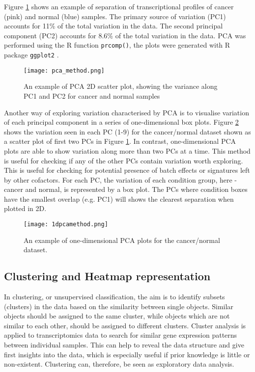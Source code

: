     Figure \ref{fig:pcamethod} shows an example of separation of transcriptional profiles of cancer (pink) and normal (blue) samples. The primary source of variation (PC1) accounts for 11\% of the total variation in the data. The second principal component (PC2) accounts for 8.6\% of the total variation in the data. PCA was performed using the R function \texttt{prcomp()}, the plots were generated with R package \texttt{ggplot2} \cite{ggplot2}.
    
            \begin{figure}[h]
            \centering
            \texttt{[image: pca\_method.png]}
            \caption{An example of PCA 2D scatter plot, showing the variance along PC1 and PC2 for cancer and normal samples}
            \label{fig:pcamethod}
            \end{figure}
        
    \newpage
    Another way of exploring variation characterised by PCA is to visualise variation of each principal component in a series of one-dimensional box plots. Figure \ref{fig:1dpcamethod} shows the variation seen in each PC (1-9) for the cancer/normal dataset shown as a scatter plot of first two PCs in Figure \ref{fig:pcamethod}. 
    In contrast, one-dimensional PCA plots are able to show variation along more than two PCs at a time. This method is useful for checking if any of the other PCs contain variation worth exploring. This is useful for checking for potential presence of batch effects or signatures left by other cofactors. 
    For each PC, the variation of each condition group, here - cancer and normal, is represented by a box plot. The PCs where condition boxes have the smallest overlap (e.g. PC1) will shows the clearest separation when plotted in 2D. 
       
    
            \begin{figure}[h]
            \centering
            \texttt{[image: 1dpcamethod.png]}
            \caption{An example of one-dimensional PCA plots for the cancer/normal dataset. }
            \label{fig:1dpcamethod}
            \end{figure}
   
  
    \subsection{Clustering and Heatmap representation}
    
    
    In clustering, or unsupervised classification, the aim is to identify subsets (clusters) in the data based on the similarity between single objects. Similar objects should be assigned to the same cluster, while objects which are not similar to each other, should be assigned to different clusters.
    Cluster analysis is applied to transcriptomics data to search for similar gene expression patterns between individual samples. This can help to reveal the data structure and give first insights into the data, which is especially useful if prior knowledge is little or non-existent. Clustering can, therefore, be seen as exploratory data analysis. 
        
